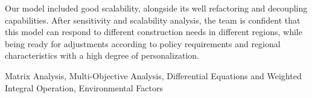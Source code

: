 \documentclass[./main.tex]{subfiles}
\begin{document}
        \vspace{1.25em}

        Our model included good scalability, alongside its well refactoring and decoupling capabilities.
        After sensitivity and scalability analysis, the team is confident that this model can respond to different construction needs in different regions, while being ready for adjustments according to policy requirements and regional characteristics with a high degree of personalization.


        \raggedright
        \vspace{2em}
        \keywords Matrix Analysis, Multi-Objective Analysis, Differential Equations and Weighted Integral
    Operation, Environmental Factors
\end{document}
